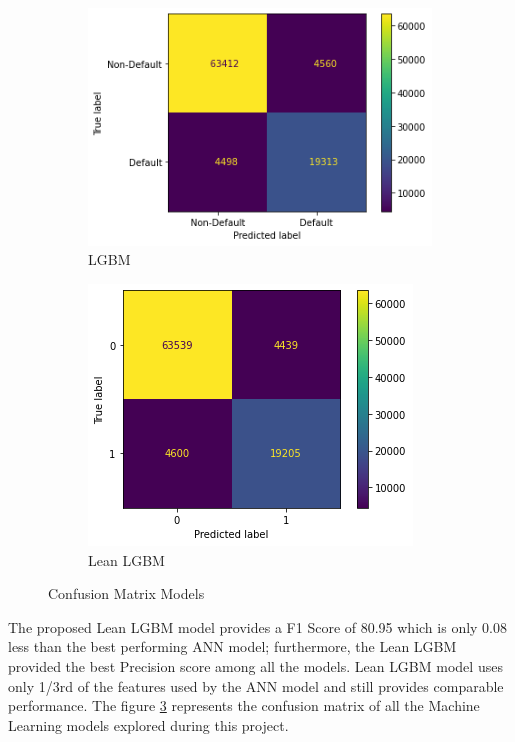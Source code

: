 \documentclass[twoside,11pt,a4paper]{article}
\begin{document}
\begin{figure}[h!]
\begin{subfigure}{0.4 \textwidth}
		\includegraphics[width=1\linewidth, height=0.8\linewidth]{cm_lgbm}
		\caption[Light Gradient Boosting Machine]{\acs{LGBM}}
		\label{fig:cm_lgbm}
	\end{subfigure}
	\hfill
	\begin{subfigure}{0.4 \textwidth}
		\includegraphics[width=1\linewidth, height=0.8\linewidth]{cm_lean_lgbm}
		\caption[Lean Light Gradient Boosting Machine]{Lean LGBM}
		\label{fig:cm_lean_lgbm}
	\end{subfigure}
	\caption[Confusion Matrix of Models]{Confusion Matrix Models}
	\label{fig:cm_ml}
\end{figure}
\FloatBarrier
The proposed Lean \acs{LGBM} model provides a F1 Score of 80.95 which is only 0.08 less than the best performing \acs{ANN} model; furthermore, the Lean \acs{LGBM} provided the best Precision score among all the models. Lean \acs{LGBM} model uses only 1/3rd of the features used by the \acs{ANN} model and still provides comparable performance. The figure \ref{fig:cm_ml} represents the confusion matrix of all the Machine Learning models explored during this project.\\
\end{document}
